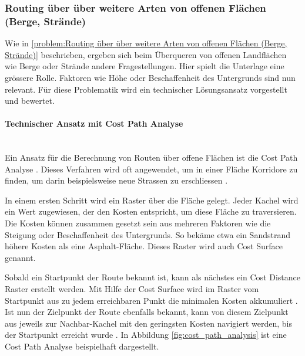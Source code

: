 \subsubsection{Routing über über weitere Arten von offenen Flächen (Berge, Strände)}
\label{subsub:Routing über über weitere Arten von offenen Flächen (Berge, Strände)}

Wie in \ref{problem:Routing über über weitere Arten von offenen Flächen (Berge, Strände)} beschrieben, ergeben sich beim Überqueren von offenen Landflächen wie Berge oder Strände andere Fragestellungen. Hier spielt die Unterlage eine grössere Rolle. Faktoren wie Höhe oder Beschaffenheit des Untergrunds sind nun relevant. Für diese Problematik wird ein technischer Lösungsansatz vorgestellt und bewertet.

\paragraph{Technischer Ansatz mit Cost Path Analyse}~\\
Ein Ansatz für die Berechnung von Routen über offene Flächen ist die Cost Path Analyse \cite{cost_path_analysis}. Dieses Verfahren wird oft angewendet, um in einer Fläche Korridore zu finden, um darin beispielsweise neue Strassen zu erschliessen \cite{gis-wiki:cost-path-analysis}.

In einem ersten Schritt wird ein Raster über die Fläche gelegt. Jeder Kachel wird ein Wert zugewiesen, der den Kosten entspricht, um diese Fläche zu traversieren. Die Kosten können zusammen gesetzt sein aus mehreren Faktoren wie die Steigung oder Beschaffenheit des Untergrunds. So bekäme etwa ein Sandstrand höhere Kosten als eine Asphalt-Fläche. Dieses Raster wird auch Cost Surface genannt. \cite{gid_fundamentals}

Sobald ein Startpunkt der Route bekannt ist, kann als nächstes ein Cost Distance Raster erstellt werden. Mit Hilfe der Cost Surface wird im Raster vom Startpunkt aus zu jedem erreichbaren Punkt die minimalen Kosten akkumuliert \cite{geospatial_analysis}. Ist nun der Zielpunkt der Route ebenfalls bekannt, kann von diesem Zielpunkt aus jeweils zur Nachbar-Kachel mit den geringsten Kosten navigiert werden, bis der Startpunkt erreicht wurde \cite{cost_path_analysis}. In Abbildung \ref{fig:cost_path_analysis} ist eine Cost Path Analyse beispielhaft dargestellt.


